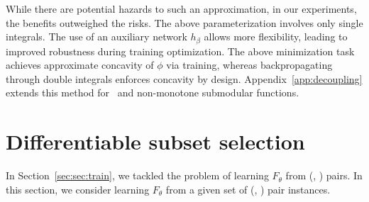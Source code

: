\documentclass{article}
\begin{document}
While there are potential hazards to such an approximation, in our experiments, the benefits outweighed the risks.
The above parameterization involves only single integrals. The use of an auxiliary network $h_{\beta}$ allows more flexibility, leading to improved robustness during training optimization.
The above minimization task achieves approximate concavity of $\phi$ via training, whereas backpropagating through double integrals enforces concavity by design.
Appendix~\ref{app:decoupling} extends this method for \asb\ and non-monotone submodular functions.

 
% 



\section{{Differentiable subset selection}}
\label{sec:summarization}

In Section~\ref{sec:sec:train}, we tackled the problem of learning $F_{\theta}$ from (\tset, \tvalue) pairs.  In this section, we consider learning $F_{\theta}$ from a given set of (\tuniv, \thigh) pair instances.
\end{document}
